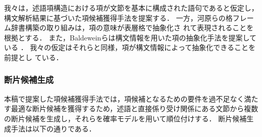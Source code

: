 \documentclass[japanese]{jnlp_1.2b}
\begin{document}
我々は，述語項構造における項が文節を基本に構成された語句であると仮定し，
構文解析結果に基づいた項候補獲得手法を提案する．
一方，河原らの格フレーム辞書構築の取り組みは，項の意味が表層格で抽象化さ
れて表現されることを根拠とする\cite[など]{kawahara05_1,kawahara05}．
また，Baldeweinらは構文情報を用いた項の抽象化手法を提案している
\cite{baldewein04}．
我々の仮定はそれらと同様，項が構文情報によって抽象化できることを前提とし
ている．



\subsubsection*{断片候補生成}

本稿で提案した項候補獲得手法では，項候補となるための要件を過不足なく満た
す最適な断片候補を獲得するため，述語と直接係り受け関係にある文節から複数
の断片候補を生成し，それらを確率モデルを用いて順位付けする．
断片候補生成手法は以下の通りである．
\end{document}
